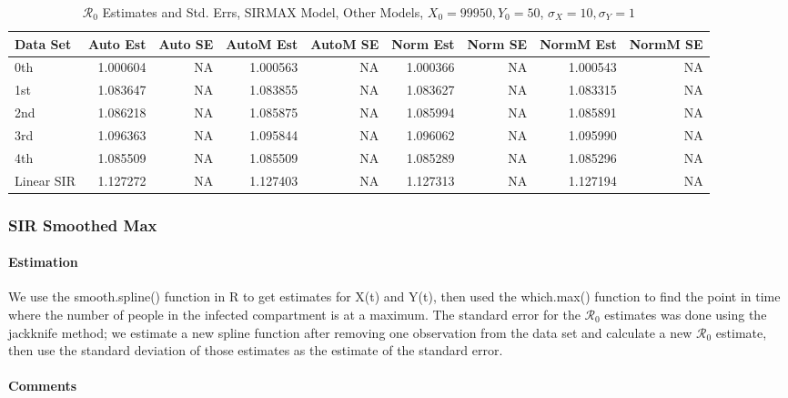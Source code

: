 \documentclass[12pt]{article}
\newcommand{\rr}{\ensuremath{\mathcal{R}_0}}
\begin{document}
\begin{table}[H]
	
	\caption{$\rr$ Estimates and Std. Errs, SIRMAX Model,
		Other Models, $X_0 = 99950, Y_0 = 50$, 
		$\sigma_X = 10, \sigma_Y = 1$}
	\begin{footnotesize}
		\hskip -1cm
		\begin{tabular}{l|r|r|r|r|r|r|r|r}
			\hline
			Data Set & Auto Est & Auto SE & AutoM Est & AutoM SE & Norm Est & Norm SE & NormM Est & NormM SE\\
			\hline
			0th & 1.000604 & NA & 1.000563 & NA & 1.000366 & NA & 1.000543 & NA\\
			\hline
			1st & 1.083647 & NA & 1.083855 & NA & 1.083627 & NA & 1.083315 & NA\\
			\hline
			2nd & 1.086218 & NA & 1.085875 & NA & 1.085994 & NA & 1.085891 & NA\\
			\hline
			3rd & 1.096363 & NA & 1.095844 & NA & 1.096062 & NA & 1.095990 & NA\\
			\hline
			4th & 1.085509 & NA & 1.085509 & NA & 1.085289 & NA & 1.085296 & NA\\
			\hline
			Linear SIR & 1.127272 & NA & 1.127403 & NA & 1.127313 & NA & 1.127194 & NA\\
			\hline
		\end{tabular}
	\end{footnotesize}
\end{table}

\subsubsection{SIR Smoothed Max}

\paragraph{Estimation}

We use the smooth.spline() function in R to get estimates for X(t) and Y(t), then used the which.max() function to find the point in time where the number of people in the infected compartment is at a maximum. The standard error for the $\rr$ estimates was done using the jackknife method; we estimate a new spline function after removing one observation from the data set and calculate a new $\rr$ estimate, then use the standard deviation of those estimates as the estimate of the standard error.

\paragraph{Comments}
\end{document}
